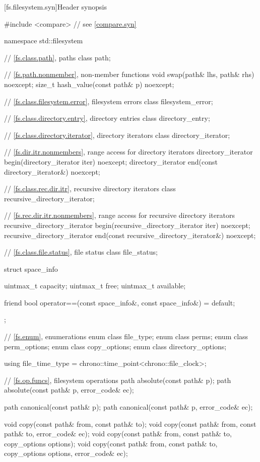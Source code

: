 [fs.filesystem.syn]{Header  synopsis}

%
\begin{codeblock}
#include <compare>              // see \ref{compare.syn}

namespace std::filesystem {
  // \ref{fs.class.path}, paths
  class path;

  // \ref{fs.path.nonmember},  non-member functions
  void swap(path& lhs, path& rhs) noexcept;
  size_t hash_value(const path& p) noexcept;

  // \ref{fs.class.filesystem.error}, filesystem errors
  class filesystem_error;

  // \ref{fs.class.directory.entry}, directory entries
  class directory_entry;

  // \ref{fs.class.directory.iterator}, directory iterators
  class directory_iterator;

  // \ref{fs.dir.itr.nonmembers}, range access for directory iterators
  directory_iterator begin(directory_iterator iter) noexcept;
  directory_iterator end(const directory_iterator&) noexcept;

  // \ref{fs.class.rec.dir.itr}, recursive directory iterators
  class recursive_directory_iterator;

  // \ref{fs.rec.dir.itr.nonmembers}, range access for recursive directory iterators
  recursive_directory_iterator begin(recursive_directory_iterator iter) noexcept;
  recursive_directory_iterator end(const recursive_directory_iterator&) noexcept;

  // \ref{fs.class.file.status}, file status
  class file_status;

  struct space_info {
    uintmax_t capacity;
    uintmax_t free;
    uintmax_t available;

    friend bool operator==(const space_info&, const space_info&) = default;
  };

  // \ref{fs.enum}, enumerations
  enum class file_type;
  enum class perms;
  enum class perm_options;
  enum class copy_options;
  enum class directory_options;

  using file_time_type = chrono::time_point<chrono::file_clock>;

  // \ref{fs.op.funcs}, filesystem operations
  path absolute(const path& p);
  path absolute(const path& p, error_code& ec);

  path canonical(const path& p);
  path canonical(const path& p, error_code& ec);

  void copy(const path& from, const path& to);
  void copy(const path& from, const path& to, error_code& ec);
  void copy(const path& from, const path& to, copy_options options);
  void copy(const path& from, const path& to, copy_options options,
            error_code& ec);

}
\end{codeblock}
